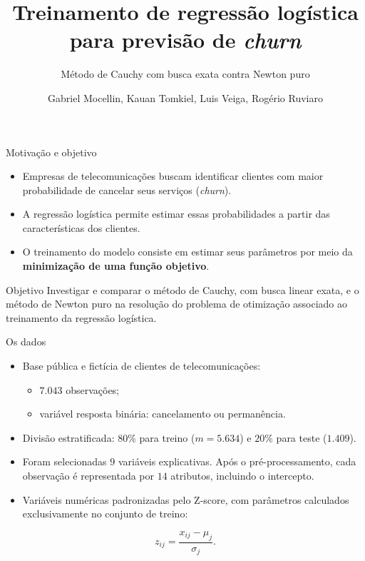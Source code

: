 \documentclass[aspectratio=169,11pt]{beamer}
\title{Treinamento de regressão logística para previsão de \textit{churn}}
\subtitle{Método de Cauchy com busca exata contra Newton puro}
\author{Gabriel Mocellin, Kauan Tomkiel, Luis Veiga, Rogério Ruviaro}
\institute{UFPR --- Programação Não Linear}
\date{}
\begin{document}
\begin{frame}\titlepage
\end{frame}

\begin{frame}{Motivação e objetivo}
\begin{itemize}
    \item Empresas de telecomunicações buscam identificar clientes com maior probabilidade de cancelar seus serviços (\textit{churn}).
    \item A regressão logística permite estimar essas probabilidades a partir das características dos clientes.
    \item O treinamento do modelo consiste em estimar seus parâmetros por meio da \textbf{minimização de uma função objetivo}.
\end{itemize}

\vspace{3mm}
\begin{block}{Objetivo}
Investigar e comparar o método de Cauchy, com busca linear exata, e o método de Newton puro na resolução do problema de otimização associado ao treinamento da regressão logística.
\end{block}
\end{frame}

\begin{frame}{Os dados}
\begin{itemize}
    \item Base pública e fictícia de clientes de telecomunicações:
    \begin{itemize}
        \item $7.043$ observações;
        \item variável resposta binária: cancelamento ou permanência.
    \end{itemize}

    \item Divisão estratificada: $80\%$ para treino ($m=5.634$) e $20\%$ para teste ($1.409$).

    \item Foram selecionadas $9$ variáveis explicativas. Após o pré-processamento, cada observação é representada por $14$ atributos, incluindo o intercepto.

    \item Variáveis numéricas padronizadas pelo Z-score, com parâmetros calculados exclusivamente no conjunto de treino:
\end{itemize}

\[
z_{ij}=\frac{x_{ij}-\mu_j}{\sigma_j}.
\]

\end{frame}
\end{document}
